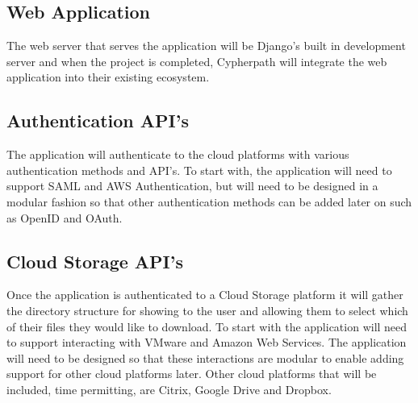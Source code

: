 \documentclass{article}
\begin{document}

        \subsection{Web Application}
        The web server that serves the application will be Django's built in development server and when the project is completed, Cypherpath will integrate
        the web application into their existing ecosystem.

        
        \subsection{Authentication API's}
        The application will authenticate to the cloud platforms with various authentication methods and API's. To start with, the application will need to support
        SAML and AWS Authentication, but will need to be designed in a modular fashion so that other authentication methods can be added later on such as OpenID and OAuth.


        \subsection{Cloud Storage API's}
        Once the application is authenticated to a Cloud Storage platform it will gather the directory structure for showing to the user and allowing them to select
        which of their files they would like to download. To start with the application will need to support interacting with VMware and Amazon Web Services. The application will
        need to be designed so that these interactions are modular to enable adding support for other cloud platforms later. Other cloud platforms that will be included, time permitting,
        are Citrix, Google Drive and Dropbox.
\end{document}
